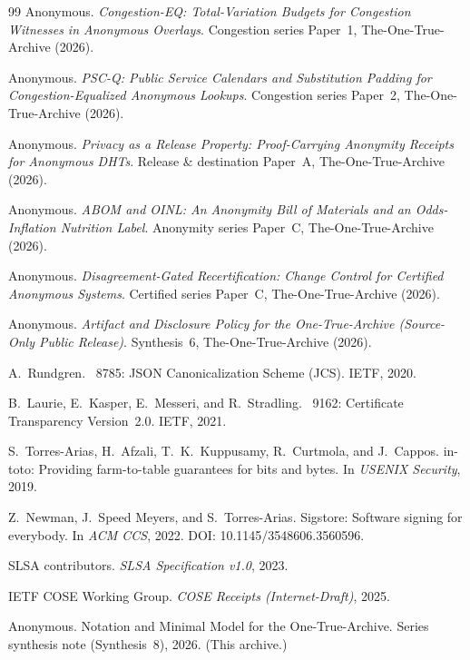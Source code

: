 \documentclass[11pt]{article}
\begin{document}
\begin{thebibliography}{99}\small
{}
Anonymous.
\newblock \emph{Congestion-EQ: Total-Variation Budgets for Congestion Witnesses in Anonymous Overlays}.
\newblock Congestion series Paper~1, The-One-True-Archive (2026).

Anonymous.
\newblock \emph{PSC-Q: Public Service Calendars and Substitution Padding for Congestion-Equalized Anonymous Lookups}.
\newblock Congestion series Paper~2, The-One-True-Archive (2026).

Anonymous.
\newblock \emph{Privacy as a Release Property: Proof-Carrying Anonymity Receipts for Anonymous DHTs}.
\newblock Release \& destination Paper~A, The-One-True-Archive (2026).

Anonymous.
\newblock \emph{ABOM and OINL: An Anonymity Bill of Materials and an Odds-Inflation Nutrition Label}.
\newblock Anonymity series Paper~C, The-One-True-Archive (2026).

Anonymous.
\newblock \emph{Disagreement-Gated Recertification: Change Control for Certified Anonymous Systems}.
\newblock Certified series Paper~C, The-One-True-Archive (2026).

Anonymous.
\newblock \emph{Artifact and Disclosure Policy for the One-True-Archive (Source-Only Public Release)}.
\newblock Synthesis~6, The-One-True-Archive (2026).

A.~Rundgren.
~8785: {JSON} Canonicalization Scheme ({JCS}).
\newblock IETF, 2020.

B.~Laurie, E.~Kasper, E.~Messeri, and R.~Stradling.
~9162: Certificate Transparency Version~2.0.
\newblock IETF, 2021.

S.~Torres-Arias, H.~Afzali, T.~K.~Kuppusamy, R.~Curtmola, and J.~Cappos.
\newblock in-toto: Providing farm-to-table guarantees for bits and bytes.
\newblock In \emph{USENIX Security}, 2019.

Z.~Newman, J.~Speed Meyers, and S.~Torres-Arias.
\newblock Sigstore: Software signing for everybody.
\newblock In \emph{ACM CCS}, 2022. DOI: 10.1145/3548606.3560596.

SLSA contributors.
\newblock \emph{SLSA Specification v1.0}, 2023.

IETF COSE Working Group.
\newblock \emph{COSE Receipts (Internet-Draft)}, 2025.

Anonymous.
\newblock Notation and Minimal Model for the One-True-Archive.
\newblock Series synthesis note (Synthesis~8), 2026. (This archive.)

\end{thebibliography}
\end{document}

